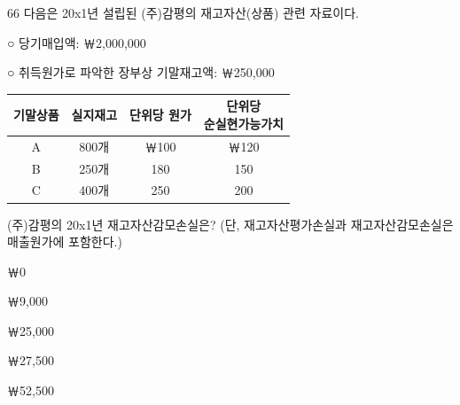 \begin{question}{66}
다음은 20x1년 설립된 (주)감평의 재고자산(상품) 관련 자료이다.
\begin{framedtext}
○ 당기매입액: ￦2,000,000 \par
○ 취득원가로 파악한 장부상 기말재고액: ￦250,000 \par
\end{framedtext}
\par{\small\centering\begin{tabular}{|c|c|c|c|}\hline
기말상품 & 실지재고 & 단위당 원가 & \makecell{단위당\\순실현가능가치} \\ \hline
A & 800개 & ￦100 & ￦120 \\ \hline
B & 250개 & 180 & 150 \\ \hline
C & 400개 & 250 & 200 \\ \hline
\end{tabular}\par}
(주)감평의 20x1년 재고자산감모손실은? (단, 재고자산평가손실과 재고자산감모손실은 매출원가에 포함한다.)
\begin{choices}
  \item ￦0
  \item ￦9,000
  \item ￦25,000
  \item ￦27,500
  \item ￦52,500
\end{choices}
\end{question}
